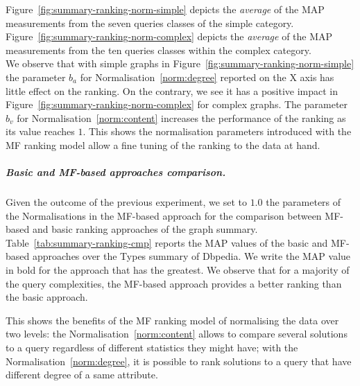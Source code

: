 Figure~\ref{fig:summary-ranking-norm-simple} depicts the \emph{average} of the MAP measurements from the seven queries classes of the simple category. Figure~\ref{fig:summary-ranking-norm-complex} depicts the \emph{average} of the MAP measurements from the ten queries classes within the complex category.\\

We observe that with simple graphs in Figure~\ref{fig:summary-ranking-norm-simple} the parameter $b_a$ for Normalisation~\ref{norm:degree} reported on the X axis has little effect on the ranking. On the contrary, we see it has a positive impact in Figure~\ref{fig:summary-ranking-norm-complex} for complex graphs.
The parameter $b_v$ for Normalisation~\ref{norm:content} increases the performance of the ranking as its value reaches $1$.
This shows the normalisation parameters introduced with the MF ranking model allow a fine tuning of the ranking to the data at hand.



\subparagraph{Basic and MF-based approaches comparison.}

Given the outcome of the previous experiment, we set to $1.0$ the parameters of the Normalisations in the MF-based approach for the comparison between MF-based and basic ranking approaches of the graph summary.\\

Table~\ref{tab:summary-ranking-cmp} reports the MAP values of the basic and MF-based approaches over the Types summary of Dbpedia. We write the MAP value in bold for the approach that has the greatest. We observe that for a majority of the query complexities, the MF-based approach provides a better ranking than the basic approach.

This shows the benefits of the MF ranking model of normalising the data over two levels: the Normalisation~\ref{norm:content} allows to compare several solutions to a query regardless of different statistics they might have; with the Normalisation~\ref{norm:degree}, it is possible to rank solutions to a query that have different degree of a same attribute.




